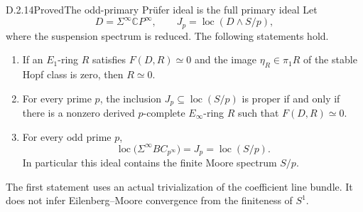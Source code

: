 \begin{claim}{D.2.14}{Proved}{The odd-primary Pr\"ufer ideal is the full primary ideal}
Let
\[
 D=\Sigma^\infty\mathbb{C}P^\infty,
 \qquad J_p=\operatorname{loc}(D\wedge S/p),
\]
where the suspension spectrum is reduced. The following statements hold.
\begin{enumerate}
\item If an $E_1$-ring $R$ satisfies $F(D,R)\simeq0$ and the image
  $\eta_R\in\pi_1R$ of the stable Hopf class is zero, then $R\simeq0$.
\item For every prime $p$, the inclusion
  $J_p\subseteq\operatorname{loc}(S/p)$ is proper if and only if there
  is a nonzero derived $p$-complete $E_\infty$-ring $R$ such that
  $F(D,R)\simeq0$.
\item For every odd prime $p$,
  \[
   \operatorname{loc}\bigl(\Sigma^\infty B C_{p^\infty}\bigr)
      =J_p=\operatorname{loc}(S/p).
   \tag{D.2.14a}
  \]
  In particular this ideal contains the finite Moore spectrum $S/p$.
\end{enumerate}
The first statement uses an actual trivialization of the coefficient
line bundle. It does not infer Eilenberg--Moore convergence from the
finiteness of $S^1$.
\end{claim}

